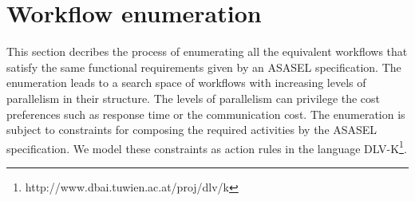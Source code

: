 

\section{Workflow enumeration} \label{sec:workflowTransformation}

This section decribes the process of enumerating all the equivalent workflows that satisfy the same functional requirements given by an ASASEL specification. The enumeration leads to a search space of workflows with increasing levels of parallelism in their structure. The levels of parallelism can privilege the cost preferences such as response time or the communication cost. The enumeration is subject to constraints for composing the required activities by the ASASEL specification. We model these constraints as action rules in the language DLV-K\footnote{http://www.dbai.tuwien.ac.at/proj/dlv/k}.

